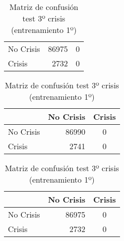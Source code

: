 \begin{table}
\begin{center}
\begin{subtable}[c]{0.4\textwidth}
\begin{tabular}{lrc}
                \hline
                No Crisis & 86975 & 0 \\
                Crisis & 2732 & 0\\
                \hline
            \end{tabular}
            \label{tab:mat-conf-stats-1.10}
        \end{subtable}
        \begin{subtable}[c]{0.4\textwidth}
            \begin{tabular}{lrc}
                \hline
                 & No Crisis & Crisis \\
                \hline
                No Crisis & 86990 & 0 \\
                Crisis & 2741 & 0\\
                \hline
            \end{tabular}
            \label{tab:mat-conf-raw-1.10}
        \end{subtable}
        \hspace{1em}\vspace{1em}
        \begin{subtable}[c]{0.4\textwidth}
                \begin{tabular}{lrc}
                \hline
                 & No Crisis & Crisis \\
                \hline
                No Crisis & 86975 & 0 \\
                Crisis & 2732 & 0\\
                \hline
            \end{tabular}
            \label{tab:mat-conf-stats-1.11}
        \end{subtable}
        \caption{Matriz de confusión test 3º crisis (entrenamiento 1º)}
        \label{tab:matriz-test-3a}
    \end{center}
\end{table}

